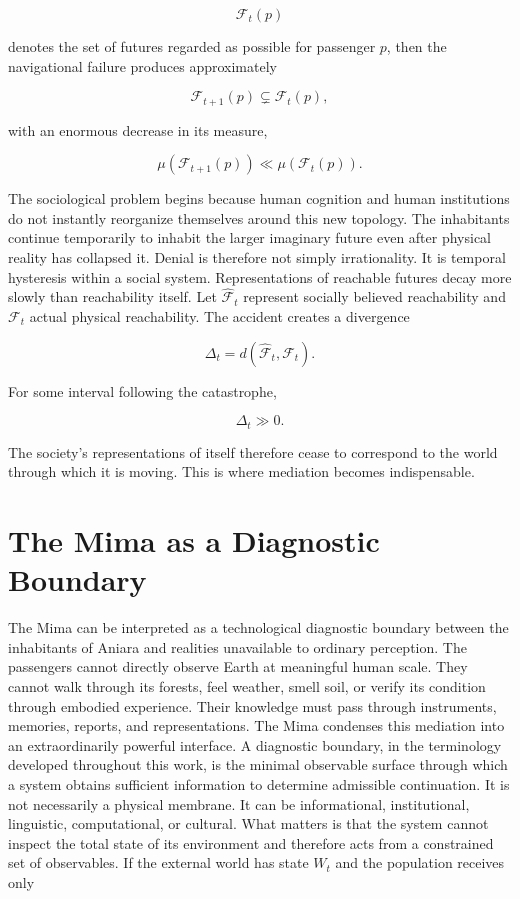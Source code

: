 \documentclass[11pt,oneside]{book}
\theoremstyle{definition}
\theoremstyle{remark}
\begin{document}
\[
\mathcal{F}_t(p)
\]

denotes the set of futures regarded as possible for passenger \(p\), then the navigational failure
produces approximately

\[
\mathcal{F}_{t+1}(p)\subsetneq\mathcal{F}_t(p),
\]

with an enormous decrease in its measure,

\[
\mu\!\left(\mathcal{F}_{t+1}(p)\right) \ll \mu\!\left(\mathcal{F}_t(p)\right).
\]

The sociological problem begins because human cognition and human institutions do not instantly
reorganize themselves around this new topology. The inhabitants continue temporarily to inhabit the
larger imaginary future even after physical reality has collapsed it. Denial is therefore not simply
irrationality. It is temporal hysteresis within a social system. Representations of reachable
futures decay more slowly than reachability itself. Let \(\widehat{\mathcal{F}}_t\) represent
socially believed reachability and \(\mathcal{F}_t\) actual physical reachability. The accident
creates a divergence

\[
\Delta_t = d\!\left( \widehat{\mathcal{F}}_t, \mathcal{F}_t \right).
\]

For some interval following the catastrophe,

\[
\Delta_t\gg0.
\]

The society's representations of itself therefore cease to correspond to the world through which it
is moving. This is where mediation becomes indispensable.

\section{The Mima as a Diagnostic Boundary}

The Mima can be interpreted as a technological diagnostic boundary between the inhabitants of Aniara
and realities unavailable to ordinary perception. The passengers cannot directly observe Earth at
meaningful human scale. They cannot walk through its forests, feel weather, smell soil, or verify
its condition through embodied experience. Their knowledge must pass through instruments, memories,
reports, and representations. The Mima condenses this mediation into an extraordinarily powerful
interface. A diagnostic boundary, in the terminology developed throughout this work, is the minimal
observable surface through which a system obtains sufficient information to determine admissible
continuation. It is not necessarily a physical membrane. It can be informational, institutional,
linguistic, computational, or cultural. What matters is that the system cannot inspect the total
state of its environment and therefore acts from a constrained set of observables. If the external
world has state \(W_t\) and the population receives only
\end{document}
